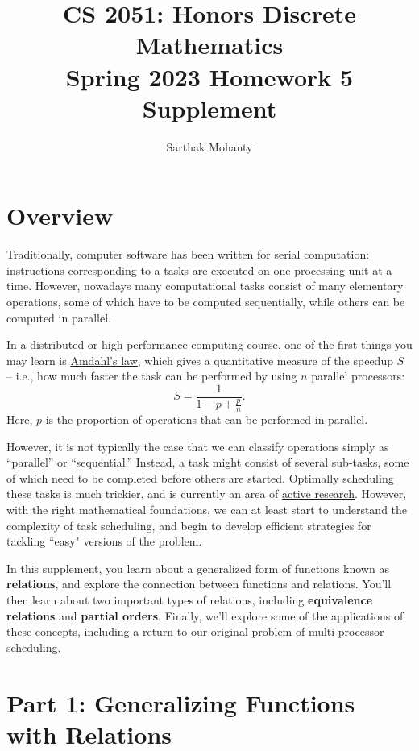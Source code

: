 \documentclass{article}
\title{\vspace{-1cm}CS 2051: Honors Discrete Mathematics \\Spring 2023 Homework 5 Supplement}
\author{Sarthak Mohanty }
\date{}
\begin{document}
\maketitle

\section*{Overview}

   \qquad Traditionally, computer software has been written for serial computation: instructions corresponding to a tasks are executed on one processing unit at a time. However, nowadays many computational tasks consist of many elementary operations, some of which have to be computed sequentially, while others can be computed in parallel.

    \vspace{2mm}
    \qquad In a distributed or high performance computing course, one of the first things you may learn is \href{https://en.wikipedia.org/wiki/Amdahls_law}{Amdahl’s law}, which gives a quantitative measure of the speedup $S$ -- i.e., how much faster the task can be performed by using $n$ parallel processors: $$S = \frac{1}{1 - p + \frac{p}{n}}.$$ Here, $p$ is the proportion of operations that can be performed in parallel.


    \vspace{2mm}
    \qquad However, it is not typically the case that we can classify operations simply as “parallel” or “sequential.” Instead, a task might consist of several sub-tasks, some of which need to be completed before others are started. Optimally scheduling these tasks is much trickier, and is currently an area of \href{https://www.cs.umd.edu/~samir/DCscheduling18/slides/Janardhan Kulkarni.pdf}{active research}. However, with the right mathematical foundations, we can at least start to understand the complexity of task scheduling, and begin to develop efficient strategies for tackling ``easy" versions of the problem.

    \vspace{2mm}
    \qquad In this supplement, you learn about a generalized form of functions known as \textbf{relations}, and explore the connection between functions and relations. You'll then learn about two important types of relations, including \textbf{equivalence relations} and \textbf{partial orders}. Finally, we'll explore some of the applications of these concepts, including a return to our original problem of multi-processor scheduling.

\section*{Part 1: Generalizing Functions with Relations}
\end{document}
